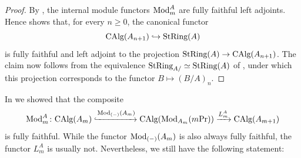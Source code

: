 \documentclass[11pt]{book}
\begin{document}
	\begin{proof}
		By , the internal module functors ${\textup{Mod}}^A_m$ are fully faithful left adjoints. Hence  shows that, for every $n \geq 0$, the canonical functor
		\[
			{\textup{CAlg}}(A_{n+1}) \hookrightarrow {\textup{StRing}}(A)
		\]
		is fully faithful and left adjoint to the projection ${\textup{StRing}}(A) \to {\textup{CAlg}}(A_{n+1})$. The claim now follows from the equivalence ${\textup{StRing}}_{A/} \simeq {\textup{StRing}}(A)$ of , under which this projection corresponds to the functor $B \mapsto (B/A)_n$.
	\end{proof}

	In  we showed that the composite
	\[
		{\textup{Mod}}^A_m\colon {\textup{CAlg}}(A_m) \xhookrightarrow{{\textup{Mod}}_{(-)}(A_m)} {\textup{CAlg}}({\textup{Mod}}_{A_m}(m\textup{Pr})) \xrightarrow{L^A_m} {\textup{CAlg}}(A_{m+1})
	\]
	is fully faithful. While the functor ${\textup{Mod}}_{(-)}(A_m)$ is also always fully faithful, the functor $L^A_m$ is usually not. Nevertheless, we still have the following statement:
\end{document}
